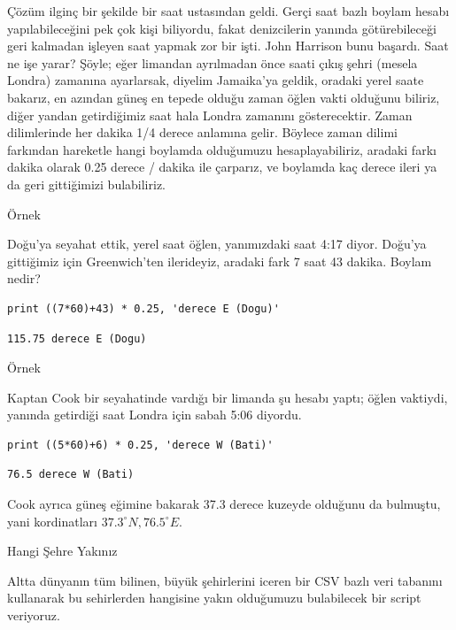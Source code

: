 \documentclass[12pt,fleqn]{article}\usepackage{../../common}
\begin{document}
Çözüm ilginç bir şekilde bir saat ustasından geldi. Gerçi saat bazlı boylam
hesabı yapılabileceğini pek çok kişi biliyordu, fakat denizcilerin yanında
götürebileceği geri kalmadan işleyen saat yapmak zor bir işti. John Harrison
bunu başardı. Saat ne işe yarar? Şöyle; eğer limandan ayrılmadan önce saati
çıkış şehri (mesela Londra) zamanına ayarlarsak, diyelim Jamaika'ya geldik,
oradaki yerel saate bakarız, en azından güneş en tepede olduğu zaman öğlen vakti
olduğunu biliriz, diğer yandan getirdiğimiz saat hala Londra zamanını
gösterecektir. Zaman dilimlerinde her dakika 1/4 derece anlamına gelir. Böylece
zaman dilimi farkından hareketle hangi boylamda olduğumuzu hesaplayabiliriz,
aradaki farkı dakika olarak 0.25 derece / dakika ile çarparız, ve boylamda kaç
derece ileri ya da geri gittiğimizi bulabiliriz.

Örnek

Doğu'ya seyahat ettik, yerel saat öğlen, yanımızdaki saat 4:17 diyor. Doğu'ya
gittiğimiz için Greenwich'ten ilerideyiz, aradaki fark 7 saat 43 dakika. Boylam
nedir?

\begin{verbatim}
print ((7*60)+43) * 0.25, 'derece E (Dogu)'
\end{verbatim}

\begin{verbatim}
115.75 derece E (Dogu)
\end{verbatim}

Örnek

Kaptan Cook bir seyahatinde vardığı bir limanda şu hesabı yaptı; öğlen vaktiydi,
yanında getirdiği saat Londra için sabah 5:06 diyordu.

\begin{verbatim}
print ((5*60)+6) * 0.25, 'derece W (Bati)'
\end{verbatim}

\begin{verbatim}
76.5 derece W (Bati)
\end{verbatim}

Cook ayrıca güneş eğimine bakarak 37.3 derece kuzeyde olduğunu da bulmuştu, yani
kordinatları $37.3^\circ N, 76.5^\circ E$.

Hangi Şehre Yakınız

Altta dünyanın tüm bilinen, büyük şehirlerini iceren bir CSV bazlı veri tabanını
kullanarak bu sehirlerden hangisine yakın olduğumuzu bulabilecek bir script
veriyoruz.
\end{document}
